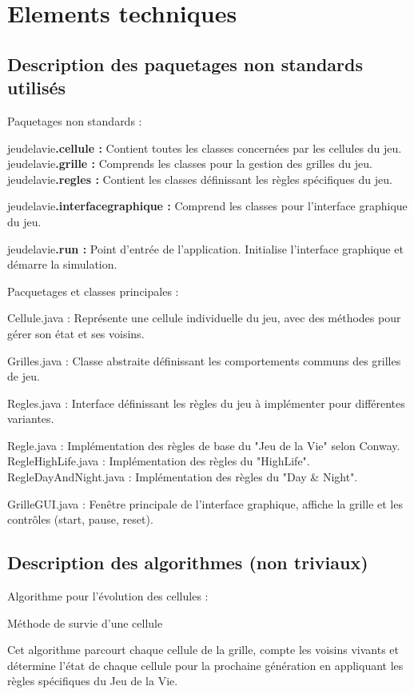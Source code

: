 \section{Elements techniques}

\subsection{Description des paquetages non standards utilisés}
    Paquetages non standards\label{ref:les classes} :

jeudelavie\textbf{.cellule :}  Contient toutes les classes concernées par les cellules du jeu.
jeudelavie\textbf{.grille :} Comprends les classes pour la gestion des grilles du jeu.
jeudelavie\textbf{.regles :} Contient les classes définissant les règles spécifiques du jeu.

jeudelavie\textbf{.interfacegraphique :} Comprend les classes pour l'interface graphique du jeu.

jeudelavie\textbf{.run :} Point d'entrée de l'application. Initialise l'interface graphique et démarre la simulation.

Pacquetages et classes principales :

Cellule.java : Représente une cellule individuelle du jeu, avec des méthodes pour gérer son état et ses voisins.

Grilles.java\label{exp} : Classe abstraite définissant les comportements communs des grilles de jeu.

Regles.java : Interface définissant les règles du jeu à implémenter pour différentes variantes.

Regle.java : Implémentation des règles de base du "Jeu de la Vie" selon Conway.
RegleHighLife.java : Implémentation des règles du "HighLife".
RegleDayAndNight.java : Implémentation des règles du "Day \& Night".

GrilleGUI.java : Fenêtre principale de l'interface graphique, affiche la grille et les contrôles (start, pause, reset).

\subsection{Description des algorithmes (non triviaux)}
Algorithme pour l'évolution des cellules :

\begin{algorithm}
  \SetAlgoLined
  
  \;
  
  \caption{Méthode de survie d'une cellule}
\end{algorithm}
Cet algorithme parcourt chaque cellule de la grille, compte les voisins vivants et détermine l'état de chaque cellule pour la prochaine génération en appliquant les règles spécifiques du Jeu de la Vie.\newline \newline

